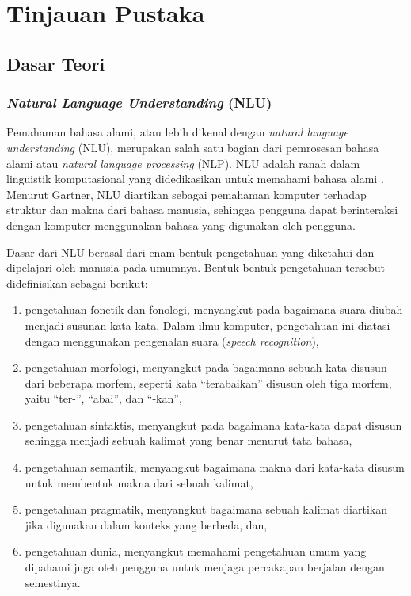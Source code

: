 \chapter{Tinjauan Pustaka}

\section{Dasar Teori}

\subsection{\textit{Natural Language Understanding} (NLU)}

Pemahaman bahasa alami, atau lebih dikenal dengan \textit{natural language understanding} (NLU), merupakan salah satu bagian dari pemrosesan bahasa alami atau \textit{natural language processing} (NLP). NLU adalah ranah dalam linguistik komputasional yang didedikasikan untuk memahami bahasa alami \parencite{harris2004voice}. Menurut Gartner, NLU diartikan sebagai pemahaman komputer terhadap struktur dan makna dari bahasa manusia, sehingga pengguna dapat berinteraksi dengan komputer menggunakan bahasa yang digunakan oleh pengguna.

Dasar dari NLU berasal dari enam bentuk pengetahuan yang diketahui dan dipelajari oleh manusia pada umumnya. Bentuk-bentuk pengetahuan tersebut didefinisikan sebagai berikut: \parencite{allen1995natural}

\begin{enumerate}
	\item pengetahuan fonetik dan fonologi, menyangkut pada bagaimana suara diubah menjadi susunan kata-kata. Dalam ilmu komputer, pengetahuan ini diatasi dengan menggunakan pengenalan suara (\textit{speech recognition}),
	\item pengetahuan morfologi, menyangkut pada bagaimana sebuah kata disusun dari beberapa morfem, seperti kata “terabaikan” disusun oleh tiga morfem, yaitu “ter-”, “abai”, dan “-kan”,
	\item pengetahuan sintaktis, menyangkut pada bagaimana kata-kata dapat disusun sehingga menjadi sebuah kalimat yang benar menurut tata bahasa,
	\item pengetahuan semantik, menyangkut bagaimana makna dari kata-kata disusun untuk membentuk makna dari sebuah kalimat,
	\item pengetahuan pragmatik, menyangkut bagaimana sebuah kalimat diartikan jika digunakan dalam konteks yang berbeda, dan,
	\item pengetahuan dunia, menyangkut memahami pengetahuan umum yang dipahami juga oleh pengguna untuk menjaga percakapan berjalan dengan semestinya.
\end{enumerate}

